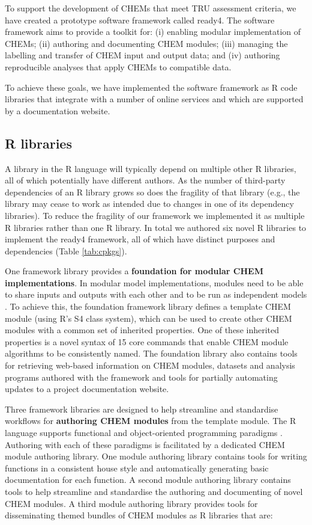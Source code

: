 \documentclass[sn-vancouver,Numbered,pdflatex]{sn-jnl}
\theoremstyle{remark}
\theoremstyle{definition}
\begin{document}
To support the development of CHEMs that meet TRU assessment criteria, we have created a prototype software framework called ready4. The software framework aims to provide a toolkit for: (i) enabling modular implementation of CHEMs; (ii) authoring and documenting CHEM modules; (iii) managing the labelling and transfer of CHEM input and output data; and (iv) authoring reproducible analyses that apply CHEMs to compatible data.

To achieve these goals, we have implemented the software framework as R \citep{RCORE2022} code libraries that integrate with a number of online services and which are supported by a documentation website.

\hypertarget{r-libraries}{%
\subsection{R libraries}\label{r-libraries}}

A library in the R language will typically depend on multiple other R libraries, all of which potentially have different authors. As the number of third-party dependencies of an R library grows so does the fragility of that library (e.g., the library may cease to work as intended due to changes in one of its dependency libraries). To reduce the fragility of our framework we implemented it as multiple R libraries rather than one R library. In total we authored six novel R libraries to implement the ready4 framework, all of which have distinct purposes and dependencies (Table \ref{tab:cpkgs}).

One framework library provides a \textbf{foundation for modular CHEM implementations}. In modular model implementations, modules need to be able to share inputs and outputs with each other and to be run as independent models \citep{barros2023empowering}. To achieve this, the foundation framework library defines a template CHEM module (using R's S4 class system), which can be used to create other CHEM modules with a common set of inherited properties. One of these inherited properties is a novel syntax of 15 core commands that enable CHEM module algorithms to be consistently named. The foundation library also contains tools for retrieving web-based information on CHEM modules, datasets and analysis programs authored with the framework and tools for partially automating updates to a project documentation website.

Three framework libraries are designed to help streamline and standardise workflows for \textbf{authoring CHEM modules} from the template module. The R language supports functional and object-oriented programming paradigms \citep{10.1214/13-STS452}. Authoring with each of these paradigms is facilitated by a dedicated CHEM module authoring library. One module authoring library contains tools for writing functions in a consistent house style and automatically generating basic documentation for each function. A second module authoring library contains tools to help streamline and standardise the authoring and documenting of novel CHEM modules. A third module authoring library provides tools for disseminating themed bundles of CHEM modules as R libraries that are:
\end{document}
